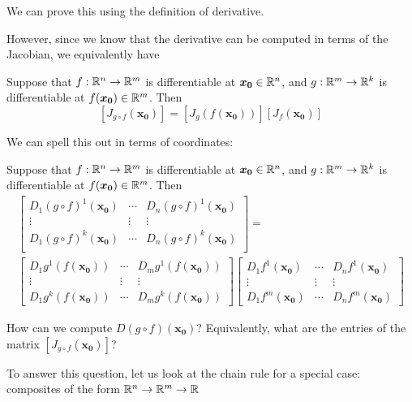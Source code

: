 We can prove this using the definition of derivative.

However, since we know that the derivative can be computed in terms of the Jacobian, we equivalently have

    \begin{theorem}
        Suppose that $f : \mathbb{R}^n \to \mathbb{R}^m$ is differentiable at $\bm{x_0} \in \mathbb{R}^n$, and $g: \mathbb{R}^m \to \mathbb{R}^k$ is differentiable at $f(\bm{x_0}) \in \mathbb{R}^m$.   Then
    $$[J_{g\circ f}(\bm{x_0})] =\left[J_g(f(\bm{x_0}))\right][J_f(\bm{x_0})]$$
    \end{theorem}

We can spell this out in terms of coordinates:

\begin{example}
    Suppose that $f : \mathbb{R}^n \to \mathbb{R}^m$ is differentiable at $\bm{x_0} \in \mathbb{R}^n$, and $g: \mathbb{R}^m \to \mathbb{R}^k$ is differentiable at $f(\bm{x_0}) \in \mathbb{R}^m$. Then
\begin{multline}
        \begin{bmatrix}
D_1(g \circ f)^1(\bm{x_0}) & \cdots & D_n(g \circ f)^1(\bm{x_0}) \\
\vdots & \vdots & \vdots\\
D_1(g \circ f)^k(\bm{x_0}) & \cdots & D_n(g \circ f)^k(\bm{x_0}) \\
\end{bmatrix} = \\
\begin{bmatrix}
D_1g^1(f(\bm{x_0})) & \cdots & D_mg^1(f(\bm{x_0})) \\
\vdots & \vdots & \vdots\\
D_1g^k(f(\bm{x_0}))  & \cdots & D_mg^k(f(\bm{x_0})) 
\end{bmatrix}
\begin{bmatrix}
D_1f^1(\bm{x_0}) & \cdots & D_nf^1(\bm{x_0}) \\
\vdots & \vdots & \vdots\\
D_1f^m(\bm{x_0})  & \cdots & D_nf^m(\bm{x_0}) 
\end{bmatrix}
\end{multline}
    \end{example}
    
\begin{motivating}
    How can we compute $D(g \circ f)(\bm{x_0})$?  Equivalently, what are the entries of the matrix $[J_{g\circ f}(\bm{x_0})]$?
\end{motivating}

To answer this question, let us look at the chain rule for a special case: composites of the form $\mathbb{R}^n \to \mathbb{R}^m \to \mathbb{R}$

